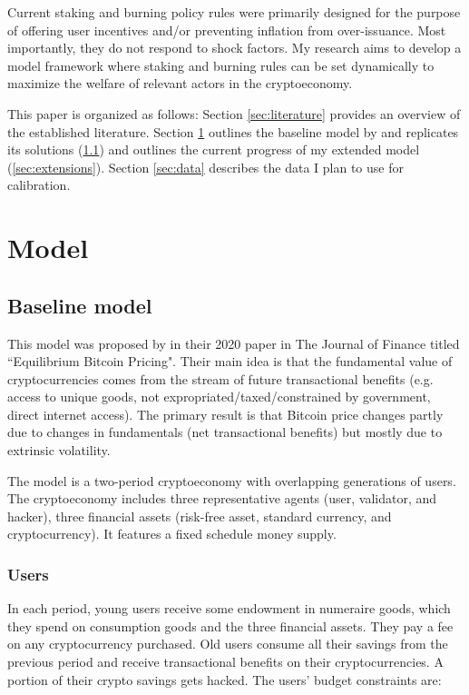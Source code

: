 \documentclass[12pt]{article}
\begin{document}
Current staking and burning policy rules were primarily designed for the purpose of offering user incentives and/or preventing inflation from over-issuance. Most importantly, they do not respond to shock factors. My research aims to develop a model framework where staking and burning rules can be set dynamically to maximize the welfare of relevant actors in the cryptoeconomy.

This paper is organized as follows: Section \ref{sec:literature} provides an overview of the established literature. Section \ref{sec:model} outlines the baseline model by \citet{biais2023equilibrium} and replicates its solutions (\ref{sec:baseline}) and outlines the current progress of my extended model (\ref{sec:extensions}). Section \ref{sec:data} describes the data I plan to use for calibration.




\section{Model} 
\label{sec:model}

\subsection{Baseline model} 
\label{sec:baseline}
This model was proposed by \citeauthor*{biais2023equilibrium} in their 2020 paper in The Journal of Finance titled ``Equilibrium Bitcoin Pricing". Their main idea is that the fundamental value of cryptocurrencies comes from the stream of future transactional benefits (e.g. access to unique goods, not expropriated/taxed/constrained by government, direct internet access). The primary result is that Bitcoin price changes partly due to changes in fundamentals (net transactional benefits) but mostly due to extrinsic volatility.

The model is a two-period cryptoeconomy with overlapping generations of users. The cryptoeconomy includes three representative agents (user, validator, and hacker), three financial assets (risk-free asset, standard currency, and cryptocurrency). It features a fixed schedule money supply.

\subsubsection{Users}
In each period, young users receive some endowment in numeraire goods, which they spend on consumption goods and the three financial assets. They pay a fee on any cryptocurrency purchased. Old users consume all their savings from the previous period and receive transactional benefits on their cryptocurrencies. A portion of their crypto savings gets hacked. The users' budget constraints are:
\end{document}
